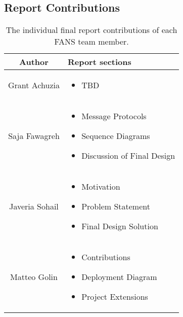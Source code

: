 \subsection{Report Contributions}

\begin{table}[H]
    \centering
    \begin{tabular}{| c | p{5in} |}
        \hline
        Author         & Report sections \\
        \hline
        Grant Achuzia  &
        \begin{itemize}
            \item TBD %
        \end{itemize}                   \\
        \hline
        Saja Fawagreh  &
        \begin{itemize}
            \item Message Protocols
            \item Sequence Diagrams
            \item Discussion of Final Design
        \end{itemize}  \\
        \hline
        Javeria Sohail &
        \begin{itemize}
            \item Motivation
            \item Problem Statement
            \item Final Design Solution
        \end{itemize}       \\
        \hline
        Matteo Golin   &
        \begin{itemize}
            \item Contributions
            \item Deployment Diagram
            \item Project Extensions
        \end{itemize}          \\
        \hline
    \end{tabular}
    \caption{The individual final report contributions of each FANS team member.}
\end{table}
